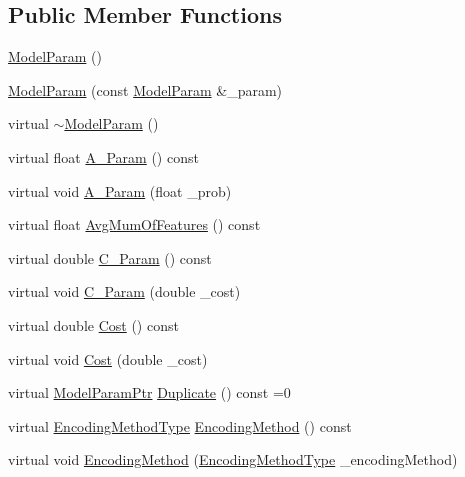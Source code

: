 \subsection*{Public Member Functions}
\begin{DoxyCompactItemize}
\item 
\hyperlink{class_k_k_m_l_l_1_1_model_param_a8edb2690da90e0af5d836f606e7eaa67}{Model\+Param} ()
\item 
\hyperlink{class_k_k_m_l_l_1_1_model_param_a01388a95d23cab0bb4aaff77423945ca}{Model\+Param} (const \hyperlink{class_k_k_m_l_l_1_1_model_param}{Model\+Param} \&\+\_\+param)
\item 
virtual \hyperlink{class_k_k_m_l_l_1_1_model_param_a64a673a4e70bb61e3cbcb527c6d8af26}{$\sim$\+Model\+Param} ()
\item 
virtual float \hyperlink{class_k_k_m_l_l_1_1_model_param_ab8fa3afcddd7ea0eac39261a9a82e3fe}{A\+\_\+\+Param} () const 
\item 
virtual void \hyperlink{class_k_k_m_l_l_1_1_model_param_a1fc116e4575f4310322f0f5cb45f3d40}{A\+\_\+\+Param} (float \+\_\+prob)
\item 
virtual float \hyperlink{class_k_k_m_l_l_1_1_model_param_aec99f861f868f93d52488816a3ef1e05}{Avg\+Mum\+Of\+Features} () const 
\item 
virtual double \hyperlink{class_k_k_m_l_l_1_1_model_param_ad1c8b59812e5a05422c2b88912002fb7}{C\+\_\+\+Param} () const 
\item 
virtual void \hyperlink{class_k_k_m_l_l_1_1_model_param_ad3d7e9b9355e05ca7765c9ce541978d6}{C\+\_\+\+Param} (double \+\_\+cost)
\item 
virtual double \hyperlink{class_k_k_m_l_l_1_1_model_param_aa857203676a55864d0202b61bc2403bc}{Cost} () const 
\item 
virtual void \hyperlink{class_k_k_m_l_l_1_1_model_param_a72731de96a5da66f736ecfa28f303acb}{Cost} (double \+\_\+cost)
\item 
virtual \hyperlink{class_k_k_m_l_l_1_1_model_param_a9207769b1dd342da66939ceffa4324cf}{Model\+Param\+Ptr} \hyperlink{class_k_k_m_l_l_1_1_model_param_ae2a628483ddd27f4c5401934ec8cbb4b}{Duplicate} () const  =0
\item 
virtual \hyperlink{class_k_k_m_l_l_1_1_model_param_a09e49f936f411dba6f08bdaf8d6b4a98}{Encoding\+Method\+Type} \hyperlink{class_k_k_m_l_l_1_1_model_param_a6c9ed6cff0839bca401fa94ecf3b4558}{Encoding\+Method} () const 
\item 
virtual void \hyperlink{class_k_k_m_l_l_1_1_model_param_abf6d4e8d9b5df99687e78ed20264a854}{Encoding\+Method} (\hyperlink{class_k_k_m_l_l_1_1_model_param_a09e49f936f411dba6f08bdaf8d6b4a98}{Encoding\+Method\+Type} \+\_\+encoding\+Method)

\end{DoxyCompactItemize}
